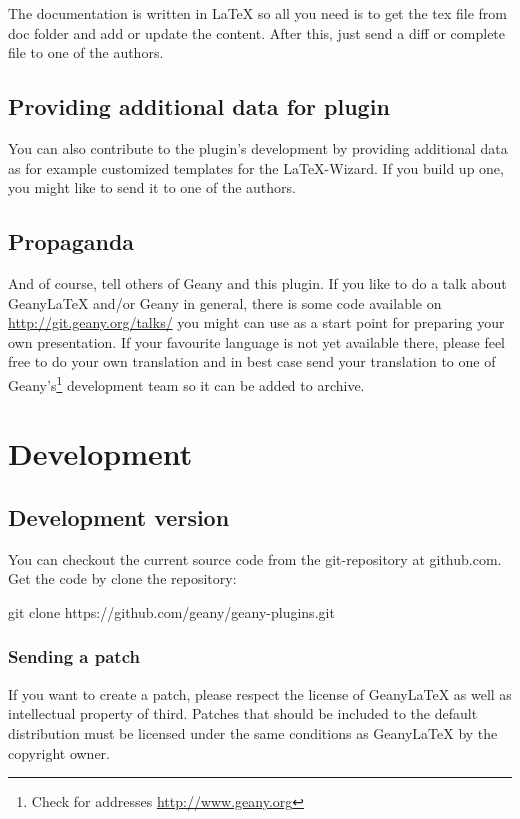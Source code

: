 \documentclass[%
paper=a4,%
fontsize=11pt,%
twoside=false,%
DIV18,%
headsepline,%
plainheadsepline,%
footsepline,%
plainfootsepline,%
bibliography=totoc,%
listof=totoc,%
BCOR10mm,%
parskip=half,%
openany,%
]{scrartcl}
\begin{document}
The documentation is written in \LaTeX{} so all you need is to get the
tex file from doc folder and add or update the content.
After this, just send a diff or complete file to one of the authors.


\subsection{Providing additional data for plugin}

You can also contribute to the plugin's development by providing
additional data as for example customized templates for the
\LaTeX-Wizard. If you build up one, you might like to send it to
one of the authors.

\subsection{Propaganda}
And of course, tell others of Geany and this plugin. If you like to do
a talk about Geany\LaTeX{} and/or Geany in general, there is some code
available on \url{http://git.geany.org/talks/} you might can use as a
start point for preparing your own presentation. If your favourite
language is not yet available there, please feel free to do your own
translation and in best case send your translation to one of
Geany's\footnote{Check for addresses \url{http://www.geany.org}}
development team so it can be added to archive.


\section{Development}
\subsection{Development version}
You can checkout the current source code from the git-repository
at github.com. Get the code by clone the repository:

git clone https://github.com/geany/geany-plugins.git

\subsubsection{Sending a patch}
\label{sec:sending_a_patch}
If you want to create a patch, please respect the license of
Geany\LaTeX{} as well as intellectual property of third. Patches that
should be included to the default distribution must be licensed under
the same conditions as Geany\LaTeX{} by the copyright owner.
\end{document}
